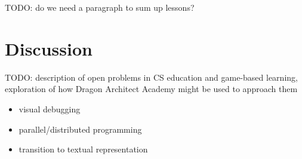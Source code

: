 \documentclass{sig-alternate}
\newcommand{\TODO}[1]{{\color{red} TODO: #1}}
\newcommand{\gametitle}{{\color{RoyalPurple} Dragon Architect Academy}}
\begin{document}
\TODO{do we need a paragraph to sum up lessons?}

\section{Discussion}
\TODO{description of open problems in CS education and game-based learning, exploration of how \gametitle{} might be used to approach them}
\begin{itemize}
\item visual debugging
\item parallel/distributed programming
\item transition to textual representation
\end{itemize}



 
\end{document}
